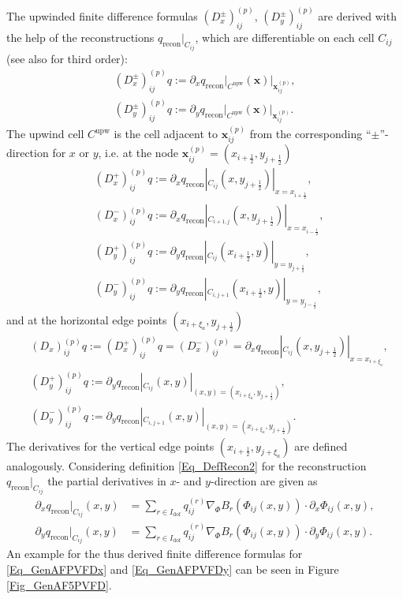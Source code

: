 \documentclass[12pt,a4paper]{article}
\begin{document}
The upwinded finite difference formulas $(D^{\pm}_x)_{ij}^{(p)}$, $(D^{\pm}_y)_{ij}^{(p)}$ are derived with the help of the reconstructions \(q_\mathrm{recon}|_{C_{ij}}\), which are differentiable on each cell \(C_{ij}\) (see also \cite{ABK2025, BKKL2024pre} for third order):
\begin{align}
(D^{\pm}_x)_{ij}^{(p)} q := \partial_x q_\mathrm{recon}\big\vert_{C^\mathrm{upw}}(\mathbf x)\big\vert_{\mathbf x_{ij}^{(p)}},\label{Eq_GenAFPVFDx}\\
(D^{\pm}_y)_{ij}^{(p)} q := \partial_y q_\mathrm{recon}\big\vert_{C^\mathrm{upw}}(\mathbf x)\big\vert_{\mathbf x_{ij}^{(p)}}.\label{Eq_GenAFPVFDy}
\end{align}
The upwind cell \(C^\mathrm{upw}\) is the cell adjacent to \(\mathbf x_{ij}^{(p)}\) from the corresponding \enquote{$\pm$}-direction for \(x\) or \(y\), i.e. at the node \(\mathbf x_{ij}^{(p)} = (x_{i+\frac{1}{2}}, y_{j+\frac{1}{2}})\)
\begin{align*}
&(D^{+}_x)_{ij}^{(p)} q:= \partial_x q_\mathrm{recon}|_{C_{ij}}(x, y_{j+\frac{1}{2}})|_{x=x_{i+\frac{1}{2}}}, \\
&(D^{-}_x)_{ij}^{(p)} q:= \partial_x q_\mathrm{recon}|_{C_{i+1,j}}(x, y_{j+\frac{1}{2}})|_{x=x_{i-\frac{1}{2}}},\\
&(D^{+}_y)_{ij}^{(p)} q:= \partial_y q_\mathrm{recon}|_{C_{ij}}(x_{i+\frac{1}{2}}, y)|_{y=y_{j+\frac{1}{2}}}, \\
&(D^{-}_y)_{ij}^{(p)} q:= \partial_y q_\mathrm{recon}|_{C_{i,j+1}}(x_{i+\frac{1}{2}}, y)|_{y=y_{j-\frac{1}{2}}},
\end{align*}
and at the horizontal edge points \((x_{i+\xi_{a}}, y_{j+\frac{1}{2}})\)
\begin{align*}
&(D_x)_{ij}^{(p)} q := (D^{+}_x)_{ij}^{(p)} q = (D^{-}_x)_{ij}^{(p)} = \partial_x q_\mathrm{recon}|_{C_{ij}}(x, y_{j+\frac{1}{2}})|_{x=x_{i+\xi_{a}}},\\
&(D^{+}_y)_{ij}^{(p)} q:= \partial_y q_\mathrm{recon}|_{C_{ij}}(x, y)|_{(x,y)=(x_{i+\xi_{a}},y_{j+\frac{1}{2}})},\\
&(D^{-}_y)_{ij}^{(p)} q:= \partial_y q_\mathrm{recon}|_{C_{i,j+1}}(x, y)|_{(x,y)=(x_{i+\xi_{a}},y_{j+\frac{1}{2}})}.
\end{align*}
The derivatives for the vertical edge points \((x_{i+\frac{1}{2}}, y_{j+\xi_{a}})\) are defined analogously. 
Considering definition \eqref{Eq_DefRecon2} for the reconstruction \(q_\mathrm{recon}|_{C_{ij}}\) the partial derivatives in $x$- and $y$-direction are given as
\begin{align}
\partial_x q_\mathrm{recon}|_{C_{ij}}(x,y) &= \sum_{r\in I_\mathrm{dof}}q_{ij}^{(r)}\nabla_\Phi B_r(\Phi_{ij}(x,y)) \cdot \partial_x \Phi_{ij}(x,y),\\
\partial_y q_\mathrm{recon}|_{C_{ij}}(x,y) &= \sum_{r\in I_\mathrm{dof}}q_{ij}^{(r)}\nabla_\Phi B_r(\Phi_{ij}(x,y)) \cdot \partial_y \Phi_{ij}(x,y).
\end{align}
An example for the thus derived finite difference formulas for \eqref{Eq_GenAFPVFDx} and \eqref{Eq_GenAFPVFDy} can be seen in Figure \ref{Fig_GenAF5PVFD}.
\end{document}
